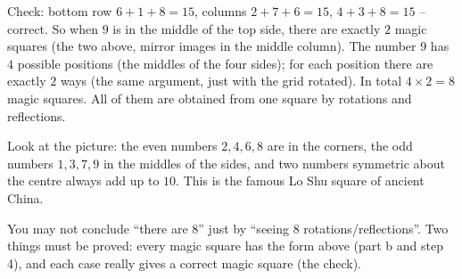 {\begin{itemize}[leftmargin=1.4em,itemsep=0pt,topsep=1pt]
\end{itemize}
\begin{figC}
\begin{scope}[xshift=3.2cm]\end{scope}
\end{figC}
Check: bottom row $6 + 1 + 8 = 15$, columns $2 + 7 + 6 = 15$, $4 + 3 + 8 = 15$ -- correct. So when $9$ is in the middle of the top side,
there are exactly $2$ magic squares (the two above, mirror images in the middle column).
The number $9$ has $4$ possible positions (the middles of the four sides); for each position there are exactly $2$ ways (the same
argument, just with the grid rotated). In total $4\times 2 = 8$ magic squares. All of them are obtained from one square by rotations
and reflections.
\begin{tipbox}Look at the picture: the even numbers $2, 4, 6, 8$ are in the corners, the odd numbers $1, 3, 7, 9$ in the middles of the
sides, and two numbers symmetric about the centre always add up to $10$. This is the famous Lo Shu square of ancient China.\end{tipbox}
\begin{warnbox}You may not conclude ``there are $8$'' just by ``seeing $8$ rotations/reflections''. Two things must be proved: every
magic square has the form above (part b and step 4), and each case really gives a correct magic square (the check).\end{warnbox}
}

